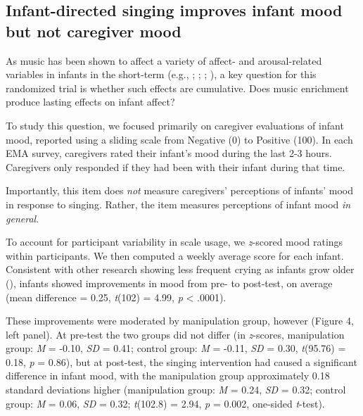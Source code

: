 \documentclass[
]{article}
\begin{document}
\subsection{Infant-directed singing improves infant mood but not
caregiver
mood}\label{infant-directed-singing-improves-infant-mood-but-not-caregiver-mood}

As music has been shown to affect a variety of affect- and
arousal-related variables in infants in the short-term (e.g.,
;
;
;
), a key question for
this randomized trial is whether such effects are cumulative. Does music
enrichment produce lasting effects on infant affect?

To study this question, we focused primarily on caregiver evaluations of
infant mood, reported using a sliding scale from Negative (0) to
Positive (100). In each EMA survey, caregivers rated their infant's mood
during the last 2-3 hours. Caregivers only responded if they had been
with their infant during that time.

Importantly, this item does \emph{not} measure caregivers' perceptions
of infants' mood in response to singing. Rather, the item measures
perceptions of infant mood \emph{in general}.

To account for participant variability in scale usage, we
\emph{z}-scored mood ratings within participants. We then computed a
weekly average score for each infant. Consistent with other research
showing less frequent crying as infants grow older
(), infants showed improvements in
mood from pre- to post-test, on average (mean difference = 0.25,
\emph{t}(102) = 4.99, \emph{p} \textless{} .0001).

These improvements were moderated by manipulation group, however (Figure
4, left panel). At pre-test the two groups did not differ (in
\emph{z}-scores, manipulation group: \emph{M} = -0.10, \emph{SD} = 0.41;
control group: \emph{M} = -0.11, \emph{SD} = 0.30, \emph{t}(95.76) =
0.18, \emph{p} = 0.86), but at post-test, the singing intervention had
caused a significant difference in infant mood, with the manipulation
group approximately 0.18 standard deviations higher (manipulation group:
\emph{M} = 0.24, \emph{SD} = 0.32; control group: \emph{M} = 0.06,
\emph{SD} = 0.32; \emph{t}(102.8) = 2.94, \emph{p} = 0.002, one-sided
\emph{t}-test).
\end{document}
